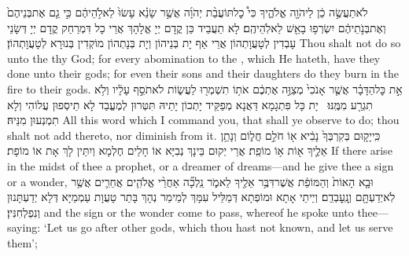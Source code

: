 {לֹא\maqqaf תַעֲשֶׂ֣ה כֵ֔ן לַיהֹוָ֖ה אֱלֹהֶ֑יךָ כִּי֩ כׇל\maqqaf תּוֹעֲבַ֨ת יְהֹוָ֜ה אֲשֶׁ֣ר שָׂנֵ֗א עָשׂוּ֙ לֵאלֹ֣הֵיהֶ֔ם כִּ֣י גַ֤ם אֶת\maqqaf בְּנֵיהֶם֙ וְאֶת\maqqaf בְּנֹ֣תֵיהֶ֔ם יִשְׂרְפ֥וּ בָאֵ֖שׁ לֵאלֹֽהֵיהֶֽם׃}
{לָא תַעֲבֵיד כֵּן קֳדָם יְיָ אֱלָהָךְ אֲרֵי כָל דִּמְרַחַק קֳדָם יְיָ דְּשָׂנֵי עָבְדִין לְטָעֲוָתְהוֹן אֲרֵי אַף יָת בְּנֵיהוֹן וְיָת בְּנָתְהוֹן מוֹקְדִין בְּנוּרָא לְטָעֲוָתְהוֹן׃}
{Thou shalt not do so unto the \lord\space thy God; for every abomination to the \lord, which He hateth, have they done unto their gods; for even their sons and their daughters do they burn in the fire to their gods.}{}
\newperek
{}%
{אֵ֣ת כׇּל\maqqaf הַדָּבָ֗ר אֲשֶׁ֤ר אָנֹכִי֙ מְצַוֶּ֣ה אֶתְכֶ֔ם אֹת֥וֹ תִשְׁמְר֖וּ לַעֲשׂ֑וֹת לֹא\maqqaf תֹסֵ֣ף עָלָ֔יו וְלֹ֥א תִגְרַ֖ע מִמֶּֽנּוּ׃ \petucha }
{יָת כָּל פִּתְגָמָא דַּאֲנָא מְפַקֵּיד יָתְכוֹן יָתֵיהּ תִּטְּרוּן לְמֶעֱבַד לָא תֵיסְפוּן עֲלוֹהִי וְלָא תִמְנְעוּן מִנֵּיהּ׃}
{All this word which I command you, that shall ye observe to do; thou shalt not add thereto, nor diminish from it.}{}
{כִּֽי\maqqaf יָק֤וּם בְּקִרְבְּךָ֙ נָבִ֔יא א֖וֹ חֹלֵ֣ם חֲל֑וֹם וְנָתַ֥ן אֵלֶ֛יךָ א֖וֹת א֥וֹ מוֹפֵֽת׃}
{אֲרֵי יְקוּם בֵּינָךְ נְבִיָּא אוֹ חָלֵים חֶלְמָא וְיִתֵּין לָךְ אָת אוֹ מוֹפָת׃}
{If there arise in the midst of thee a prophet, or a dreamer of dreams—and he give thee a sign or a wonder,}{}
{וּבָ֤א הָאוֹת֙ וְהַמּוֹפֵ֔ת אֲשֶׁר\maqqaf דִּבֶּ֥ר אֵלֶ֖יךָ לֵאמֹ֑ר נֵֽלְכָ֞ה אַחֲרֵ֨י אֱלֹהִ֧ים אֲחֵרִ֛ים אֲשֶׁ֥ר לֹֽא\maqqaf יְדַעְתָּ֖ם וְנׇֽעׇבְדֵֽם׃}
{וְיֵיתֵי אָתָא וּמוֹפְתָא דְּמַלֵּיל עִמָּךְ לְמֵימַר נְהָךְ בָּתַר טָעֲוָת עַמְמַיָּא דְּלָא יְדַעְתָּנוּן וְנִפְלְחִנִּין׃}
{and the sign or the wonder come to pass, whereof he spoke unto thee—saying: ‘Let us go after other gods, which thou hast not known, and let us serve them’;}{}
